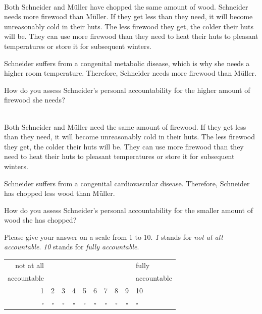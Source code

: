 \documentclass[smallcondensed]{svjour3}
\begin{document}
%
\vspace{1ex}
\\
Both Schneider and M\"uller have chopped the same amount of wood. Schneider needs more firewood than M\"uller. If they get less than they need, it will become unreasonably cold in their huts. The less firewood they get, the colder their huts will be. They can use more firewood than they need to heat their huts to pleasant temperatures or store it for subsequent winters.\par
%
Schneider suffers from a congenital metabolic disease, which is why she needs a higher room temperature. Therefore, Schneider needs more firewood than M\"uller.\par
%
How do you assess Schneider's personal accountability for the higher amount of firewood she needs?\par
%
\vspace{1ex}
\\
Both Schneider and M\"uller need the same amount of firewood. If they get less than they need, it will become unreasonably cold in their huts. The less firewood they get, the colder their huts will be. They can use more firewood than they need to heat their huts to pleasant temperatures or store it for subsequent winters.\par
%
Schneider suffers from a congenital cardiovascular disease. Therefore, Schneider has chopped less wood than M\"uller.\par
%
How do you assess Schneider's personal accountability for the smaller amount of wood she has chopped?\par
%
\vspace{1ex}
\noindent Please give your answer on a scale from 1 to 10. \textit{1} stands for \textit{not at all accountable}. \textit{10} stands for \textit{fully accountable}.\par
%
\vspace{1ex}
\begin{tabular}{rccccccccl}
   not at all    &             &             &             &             &             &             &             &             & fully         \\
   accountable   &             &             &             &             &             &             &             &             & accountable   \\
   1             & 2           & 3           & 4           & 5           & 6           & 7           & 8           & 9           & 10            \\
   $\square$     & $\square$   & $\square$   & $\square$   & $\square$   & $\square$   & $\square$   & $\square$   & $\square$   & $\square$     \\
\end{tabular}
%
\clearpage
%
\end{document}
